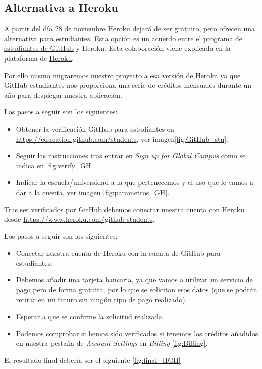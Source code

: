  
\subsection{Alternativa a Heroku}

A partir del día 28 de noviembre Heroku dejará de ser gratuito, pero ofrecen una alternativa para estudiantes. Esta opción es un acuerdo entre el \href{https://education.github.com}{programa de estudiantes de GitHub} y Heroku. 
Esta colaboración viene explicada en la plataforma de \href{https://blog.heroku.com/github-student-developer-program}{Heroku}.

Por ello mismo migraremos nuestro proyecto a esa versión de Heroku ya que GitHub estudiantes nos proporciona una serie de créditos mensuales durante un año para desplegar nuestra aplicación.

Los pasos a seguir son los siguientes:
\begin{itemize}
	\item Obtener la verificación GitHub para estudiantes en
	 \href{https://education.github.com/students}{https://education.github.com/students}, ver imagen\ref{fig:GitHub_stu}.
	\item Seguir las instrucciones tras entrar en \emph{Sign up for Global Campus} como se indica en \ref{fig:verify_GH}.
	\item Indicar la escuela/universidad a la que pertenecemos y el uso que le vamos a dar a la cuenta, ver imagen \ref{fig:parametros_GH}.
\end{itemize}




Tras ser verificados por GitHub debemos conectar nuestra cuenta con Heroku desde \href{https://www.heroku.com/github-students}{https://www.heroku.com/github-students}.

Los pasos a seguir son los siguientes:
\begin{itemize}
	\item Conectar nuestra cuenta de Heroku con la cuenta de GitHub para estudiantes.
	\item Debemos añadir una tarjeta bancaria, ya que vamos a utilizar un servicio de pago pero de forma gratuita, por lo que se solicitan esos datos (que se podrán retirar en un futuro sin ningún tipo de pago realizado).
	\item Esperar a que se confirme la solicitud realizada.
	\item Podemos comprobar si hemos sido verificados si tenemos los créditos añadidos en nuestra pestaña de \emph{Account Settings} en \emph{Billing} \ref{fig:Billing}.
\end{itemize}
El resultado final debería ser el siguiente \ref{fig:final_HGH}

